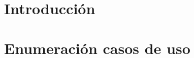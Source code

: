 \documentclass[a4paper, 11pt]{article}
\begin{document}
\pagestyle{myheadings}
\maketitle

\thispagestyle{empty}
\tableofcontents

\newpage

\section{Introducción}


\newpage
\section{Enumeraci\'on casos de uso}
\end{document}
